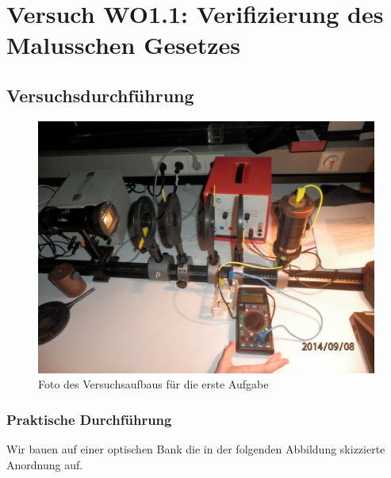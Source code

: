 \documentclass[12pt]{scrartcl}
\begin{document}
\section{Versuch WO1.1: Verifizierung des Malusschen Gesetzes}
\subsection{Versuchsdurchführung}

\begin{figure}[H]
\centering
    \includegraphics[scale = 0.1]{aufgabe_1.JPG}
  	\caption[Foto des Versuchsaufbaus für die erste Aufgabe]{Foto des Versuchsaufbaus für die erste Aufgabe}
  \label{fig:aufgabe_1}
\end{figure}

\subsubsection{Praktische Durchführung}
Wir bauen auf einer optischen Bank die in 
der folgenden Abbildung skizzierte Anordnung auf.
\end{document}
